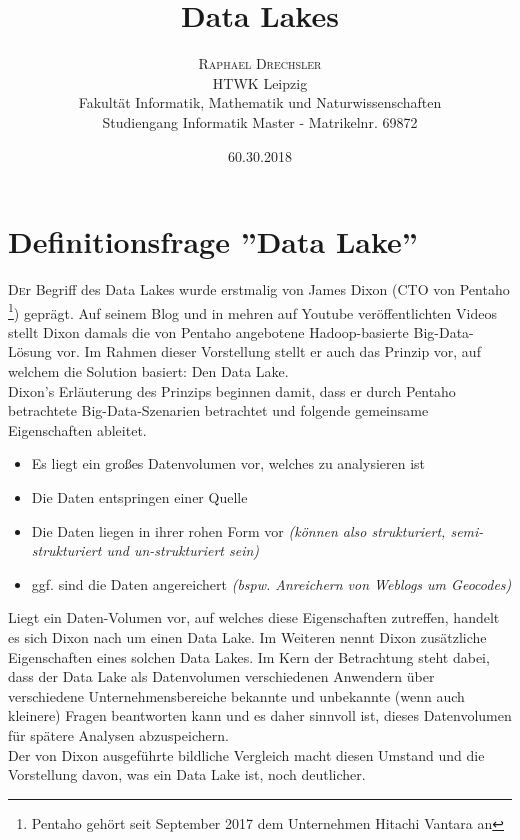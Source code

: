 \documentclass[twoside,twocolumn]{article}
\title{Data Lakes} %
\author{%
\textsc{Raphael Drechsler}\\[1ex] %
\normalsize HTWK Leipzig \\ 
\normalsize Fakultät Informatik, Mathematik und Naturwissenschaften\\ 
\normalsize Studiengang Informatik Master - Matrikelnr. 69872\\%
}
\date{60.30.2018} %
\begin{document}
\maketitle


\section{Definitionsfrage ''Data Lake''}
\lettrine[nindent=0em,lines=2]{D}er Begriff des Data Lakes wurde erstmalig von James Dixon (CTO von Pentaho \footnote{Pentaho gehört seit September 2017 dem Unternehmen Hitachi Vantara an}) geprägt. Auf seinem Blog \cite{src5}  und in mehren auf Youtube veröffentlichten Videos \cite{src6} stellt Dixon damals die von Pentaho angebotene Hadoop-basierte Big-Data-Lösung vor. Im Rahmen dieser Vorstellung stellt er auch das Prinzip vor, auf welchem die Solution basiert: Den Data Lake.\\
Dixon's Erläuterung des Prinzips beginnen damit, dass er durch Pentaho betrachtete Big-Data-Szenarien betrachtet und folgende gemeinsame Eigenschaften ableitet. 
\begin{itemize}
	\item Es liegt ein großes Datenvolumen vor, welches zu analysieren ist
	\item Die Daten entspringen einer Quelle
	\item Die Daten liegen in ihrer rohen Form vor \textit{(können also strukturiert, semi-strukturiert und un-strukturiert sein)}
	\item ggf. sind die Daten angereichert \textit{(bspw. Anreichern von Weblogs um Geocodes)}
\end{itemize}

\noindent Liegt ein Daten-Volumen vor, auf welches diese Eigenschaften zutreffen, handelt es sich Dixon nach um einen Data Lake. Im Weiteren nennt Dixon zusätzliche Eigenschaften eines solchen Data Lakes. Im Kern der Betrachtung steht dabei, dass der Data Lake als Datenvolumen verschiedenen Anwendern über verschiedene Unternehmensbereiche bekannte und unbekannte (wenn auch kleinere) Fragen beantworten kann und es daher sinnvoll ist, dieses Datenvolumen für spätere Analysen abzuspeichern.\\
Der von Dixon ausgeführte bildliche Vergleich macht diesen Umstand und die Vorstellung davon, was ein Data Lake ist, noch deutlicher.
\end{document}
